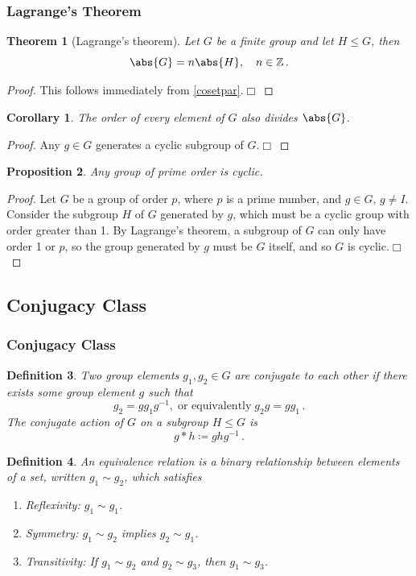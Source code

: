 \documentclass{article}
\theoremstyle{plain}\theoremheaderfont{\normalfont\itshape}\theorembodyfont{\rmfamily}\theoremseparator{.}\newtheorem*{rem}{Remark}\newtheorem*{ex}{Example}\newtheorem*{proof}{Proof}\newtheorem*{altp}{Alternative proof}
\theoremstyle{plain}\theoremheaderfont{\normalfont\bfseries}\theorembodyfont{\rmfamily}\theoremseparator{.}\newtheorem{thm}{Theorem}[section]\newtheorem{lem}[thm]{Lemma}\newtheorem{prop}[thm]{Proposition}\newtheorem*{cor}{Corollary}\newtheorem{defn}[thm]{Definition}\newtheorem{clm}[thm]{Claim}\newtheorem{clminproof}{Claim}
\theoremstyle{break}\theoremheaderfont{\normalfont\itshape}\theorembodyfont{\rmfamily}\theoremseparator{.\medskip}\newtheorem*{proofskip}{Proof}\newtheorem*{exs}{Examples}\newtheorem*{rems}{Remarks}
\theoremstyle{break}\theoremheaderfont{\normalfont\bfseries}\theorembodyfont{\rmfamily}\theoremseparator{.\medskip}\newtheorem{lemskip}[thm]{Lemma}\newtheorem{defnskip}[thm]{Definition}\newtheorem{propskip}[thm]{Proposition}\newtheorem{thmskip}[thm]{Theorem}
\numberwithin{equation}{section}
\newcommand{\qed}{\hfill\ensuremath{\Box}}
\begin{document}
	\subsubsection{Lagrange's Theorem}
	\begin{thm}[Lagrange's theorem]	
		Let \(G\) be a finite group and let \(H\le G\), then
		\[\abs{G}=n\abs{H},\quad n\in\mathbb{Z}\,.\]
	\end{thm}
	\begin{proof}
		This follows immediately from \cref{cosetpar}.\qed
	\end{proof}
	\begin{cor}
		The order of every element of \(G\) also divides \(\abs{G}\).
	\end{cor}
	\begin{proof}
		Any \(g\in G\) generates a cyclic subgroup of \(G\).\qed
	\end{proof}
	\begin{prop}
		Any group of prime order is cyclic.
	\end{prop}
	\begin{proof}
		Let \(G\) be a group of order \(p\), where \(p\) is a prime number, and \(g\in G\), \(g\ne I\). Consider the subgroup \(H\) of \(G\) generated by \(g\), which must be a cyclic group with order greater than 1. By Lagrange's theorem, a subgroup of \(G\) can only have order 1 or \(p\), so the group generated by \(g\) must be \(G\) itself, and so \(G\) is cyclic.\qed
	\end{proof}
	\subsection{Conjugacy Class}
	\subsubsection{Conjugacy Class}
	\begin{defn}
		Two group elements \(g_1, g_2\in G\) are \textit{conjugate} to each other if there exists some group element \(g\) such that
		\[g_2=gg_1g^{-1},\;\text{or equivalently}\; g_2g=gg_1\,.\]
		The \textit{conjugate action} of \(G\) on a subgroup \(H\le G\) is
		\[g*h\coloneqq ghg^{-1}\,.\]
	\end{defn}
	\begin{defn}
		An \textit{equivalence relation} is a binary relationship between elements of a set, written \(g_1\sim g_2\), which satisfies
		\begin{enumerate}[topsep=0pt]
			\item[(i)] \textit{Reflexivity}: \(g_1\sim g_1\).
			\item[(ii)] \textit{Symmetry}: \(g_1\sim g_2\) implies \(g_2\sim g_1\).
			\item[(iii)] \textit{Transitivity}: If \(g_1\sim g_2\) and \(g_2\sim g_3\), then \(g_1\sim g_3\).
		\end{enumerate}
	\end{defn}
	
\end{document}
